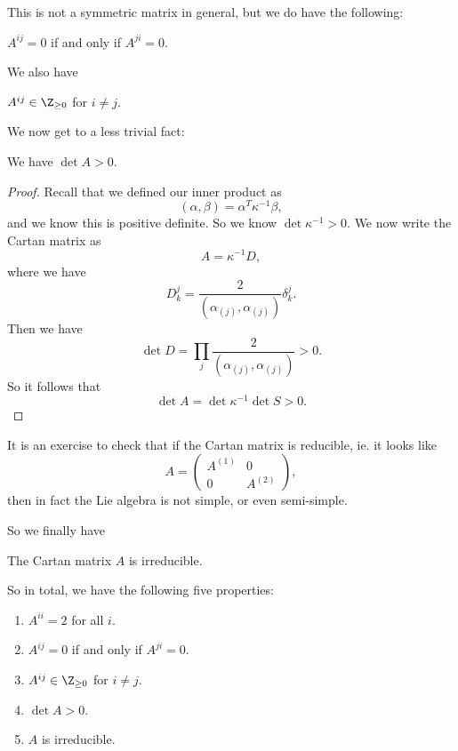 \documentclass[a4paper]{article}
\begin{document}
This is not a symmetric matrix in general, but we do have the following:
\begin{prop}
  $A^{ij} = 0$ if and only if $A^{ji} = 0$.
\end{prop}

We also have
\begin{prop}
  $A^{ij} \in \Z_{\geq 0}$ for $i \not= j$.
\end{prop}

We now get to a less trivial fact:
\begin{prop}
  We have $\det A > 0$.
\end{prop}

\begin{proof}
  Recall that we defined our inner product as
  \[
    (\alpha, \beta) = \alpha^T \kappa^{-1} \beta,
  \]
  and we know this is positive definite. So we know $\det \kappa^{-1} > 0$. We now write the Cartan matrix as
  \[
    A = \kappa^{-1}D,
  \]
  where we have
  \[
    D_k^j = \frac{2}{(\alpha_{(j)}, \alpha_{(j)})} \delta^j_k.
  \]
  Then we have
  \[
    \det D = \prod_j \frac{2}{(\alpha_{(j)}, \alpha_{(j)})} > 0.
  \]
  So it follows that
  \[
    \det A = \det \kappa^{-1} \det S > 0.
  \]
\end{proof}

It is an exercise to check that if the Cartan matrix is reducible, ie. it looks like
\[
  A =
  \begin{pmatrix}
    A^{(1)} & 0\\
    0 & A^{(2)}
  \end{pmatrix},
\]
then in fact the Lie algebra is not simple, or even semi-simple.

So we finally have
\begin{prop}
  The Cartan matrix $A$ is irreducible.
\end{prop}

So in total, we have the following five properties:
\begin{prop}\leavevmode
  \begin{enumerate}
    \item $A^{ii} = 2$ for all $i$.
    \item $A^{ij} = 0$ if and only if $A^{ji} = 0$.
    \item $A^{ij} \in \Z_{\geq 0}$ for $i \not= j$.
    \item $\det A > 0$.
    \item $A$ is irreducible.
  \end{enumerate}
\end{prop}
\end{document}
